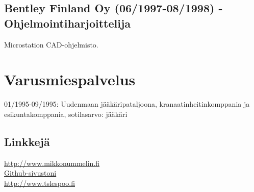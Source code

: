 \documentclass[a4paper,12pt]{article}
\begin{document}
\subsection*{Bentley Finland Oy (06/1997-08/1998) - Ohjelmointiharjoittelija}
Microstation CAD-ohjelmisto.
\section*{Varusmiespalvelus}
01/1995-09/1995: Uudenmaan jääkäripataljoona, kranaatinheitinkomppania ja esikuntakomppania, sotilasarvo: jääkäri
\subsection*{Linkkejä}
\href{http://www.mikkonummelin.fi}{http://www.mikkonummelin.fi} \\
\href{http://github.com/mnummeli}{Github-sivustoni} \\
\href{http://www.tslespoo.fi}{http://www.tslespoo.fi}
\end{document}

